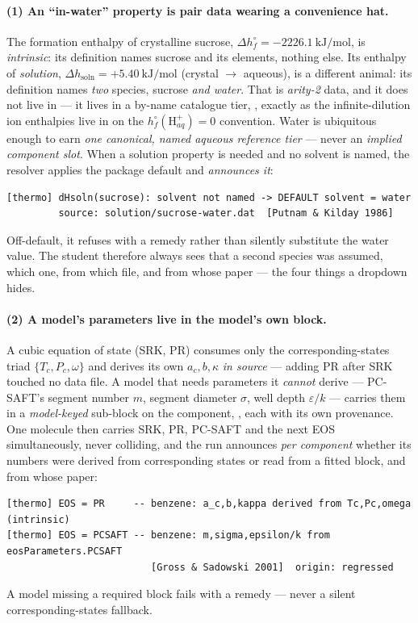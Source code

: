 \documentclass[11pt,a4paper]{article}
\begin{document}
\paragraph{(1) An ``in-water'' property is pair data wearing a
convenience hat.}
The formation enthalpy of crystalline sucrose,
$\Delta h^{\circ}_{f} = -2226.1~\mathrm{kJ/mol}$, is \emph{intrinsic}:
its definition names sucrose and its elements, nothing else.  Its
enthalpy of \emph{solution}, $\Delta h_{\mathrm{soln}} =
+5.40~\mathrm{kJ/mol}$ (crystal $\to$ aqueous), is a different animal:
its definition names \emph{two} species, sucrose \emph{and water}.  That
is \emph{arity-2} data, and it does not live in  --- it
lives in a by-name catalogue tier,
, exactly as the
infinite-dilution ion enthalpies live in
 on the
$h^{\circ}_f(\mathrm{H}^+_{aq})=0$ convention.  Water is ubiquitous
enough to earn \emph{one canonical, named aqueous reference tier} ---
never an \emph{implied component slot}.  When a solution property is
needed and no solvent is named, the resolver applies the package default
and \emph{announces it}:
\begin{lstlisting}[language=dict]
[thermo] dHsoln(sucrose): solvent not named -> DEFAULT solvent = water
         source: solution/sucrose-water.dat  [Putnam & Kilday 1986]
\end{lstlisting}
Off-default, it refuses with a remedy rather than silently substitute
the water value.  The student therefore always sees that a second
species was assumed, which one, from which file, and from whose paper
--- the four things a dropdown hides.

\paragraph{(2) A model's parameters live in the model's own block.}
A cubic equation of state (SRK, PR) consumes only the
corresponding-states triad $\{T_c, P_c, \omega\}$ and derives its own
$a_c, b, \kappa$ \emph{in source} --- adding PR after SRK touched no data
file.  A model that needs parameters it \emph{cannot} derive ---
PC-SAFT's segment number $m$, segment diameter $\sigma$, well depth
$\varepsilon/k$ --- carries them in a \emph{model-keyed} sub-block on the
component, , each with its own
provenance.  One molecule then carries SRK, PR, PC-SAFT and the next EOS
simultaneously, never colliding, and the run announces \emph{per
component} whether its numbers were derived from corresponding states or
read from a fitted block, and from whose paper:
\begin{lstlisting}[language=dict]
[thermo] EOS = PR     -- benzene: a_c,b,kappa derived from Tc,Pc,omega (intrinsic)
[thermo] EOS = PCSAFT -- benzene: m,sigma,epsilon/k from eosParameters.PCSAFT
                         [Gross & Sadowski 2001]  origin: regressed
\end{lstlisting}
A model missing a required block fails with a remedy --- never a silent
corresponding-states fallback.
\end{document}
